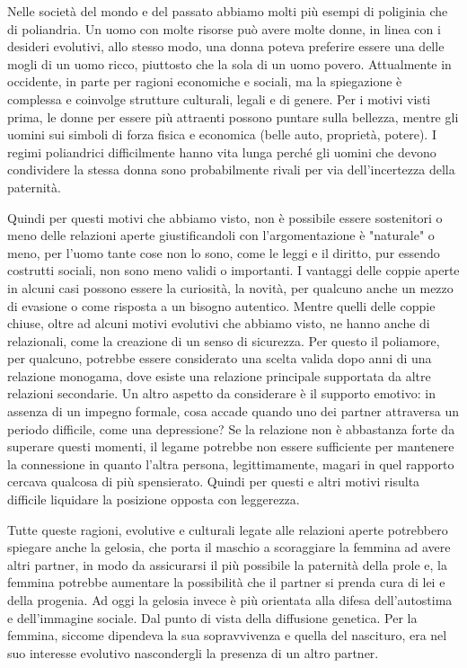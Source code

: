 \documentclass[12pt]{book} %
\begin{document}
Nelle società del mondo e del passato abbiamo molti più esempi di poliginia che di poliandria. Un uomo con molte risorse
può avere molte donne, in linea con i desideri evolutivi, allo stesso modo, una donna poteva preferire essere una delle
mogli di un uomo ricco, piuttosto che la sola di un uomo povero. Attualmente in occidente, in parte per ragioni economiche e sociali, ma la spiegazione è complessa e coinvolge strutture culturali, legali e di genere. Per i motivi visti prima, le donne per essere
più attraenti possono puntare sulla bellezza, mentre gli uomini sui simboli di forza fisica e economica (belle auto, proprietà,
potere). I regimi poliandrici difficilmente hanno vita lunga perché gli uomini che devono condividere la stessa donna
sono probabilmente rivali per via dell'incertezza della paternità.

Quindi per questi motivi che abbiamo visto, non è possibile essere sostenitori o meno delle relazioni aperte giustificandoli con l'argomentazione è "naturale" o meno, per l'uomo tante cose non lo sono, come le leggi e il diritto, pur essendo costrutti sociali, non sono meno validi o importanti. I vantaggi delle coppie aperte in alcuni casi possono essere la curiosità, la novità, per qualcuno anche un mezzo di evasione o come risposta a un bisogno autentico. Mentre quelli delle coppie chiuse, oltre ad alcuni motivi evolutivi che abbiamo visto, ne hanno anche di relazionali, come la creazione di un senso di sicurezza. Per questo il poliamore, per qualcuno, potrebbe essere considerato una scelta valida dopo anni di una relazione monogama, dove esiste una relazione principale supportata da altre relazioni secondarie.
Un altro aspetto da considerare è il supporto emotivo: in assenza di un impegno formale, cosa accade quando uno dei partner attraversa un periodo difficile, come una depressione? Se la relazione non è abbastanza forte da superare questi momenti, il legame potrebbe non essere sufficiente per mantenere la connessione in quanto l'altra persona, legittimamente, magari in quel rapporto cercava qualcosa di più spensierato. Quindi per questi e altri motivi risulta difficile liquidare la posizione opposta con leggerezza.

Tutte queste ragioni, evolutive e culturali legate alle relazioni aperte potrebbero spiegare anche la gelosia, che porta il maschio a scoraggiare la femmina ad avere altri
partner, in modo da assicurarsi il più possibile la paternità della prole e, la femmina potrebbe aumentare la possibilità che
il partner si prenda cura di lei e della progenia. Ad oggi la gelosia invece è più orientata alla difesa
dell'autostima e dell'immagine sociale. Dal punto di vista della diffusione genetica. Per la femmina, siccome dipendeva la sua sopravvivenza e quella del nascituro, era nel suo interesse evolutivo nascondergli la presenza di un altro partner.
\end{document}
